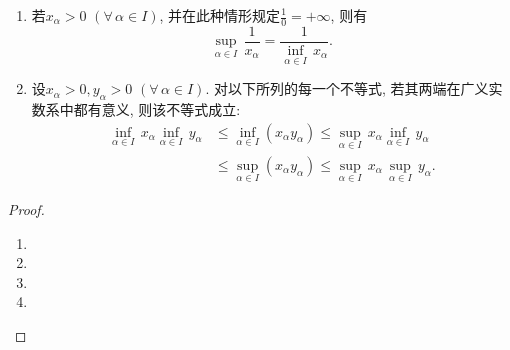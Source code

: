 \begin{4a}
\begin{itemize}
\begin{enumerate}[label=(\roman*)]
\[\begin{split}
\leqslant\underset{\alpha\in I}{\sup}\,x_\alpha+\underset{\alpha\in I}{\sup}\,y_\alpha.
\end{split}\]
\item 若\(x_\alpha>0\) \((\forall\,\alpha\in I)\), 并在此种情形规定\(\frac{1}{0}=+\infty\), 则有\[ \underset{\alpha\in I}{\sup}\,\frac{1}{x_\alpha}=\frac{1}{\underset{\alpha\in I}{\inf}\,x_\alpha}.\]
\item 设\(x_\alpha>0,y_\alpha>0\) \((\forall\,\alpha\in I)\). 
对以下所列的每一个不等式, 若其两端在广义实数系中都有意义, 则该不等式成立: 
\[\begin{split}
\underset{\alpha\in I}{\inf}\,x_\alpha\underset{\alpha\in I}{\inf}\,y_\alpha
&\leqslant \underset{\alpha\in I}{\inf}(x_\alpha y_\alpha)
\leqslant\underset{\alpha\in I}{\sup}\,x_\alpha\underset{\alpha\in I}{\inf}\,y_\alpha\\
&\leqslant\underset{\alpha\in I}{\sup}(x_\alpha y_\alpha)
\leqslant\underset{\alpha\in I}{\sup}\,x_\alpha\,\underset{\alpha\in I}{\sup}\,y_\alpha.
\end{split}\]
\end{enumerate}
\begin{proof}
\begin{enumerate}[label=(\roman*)]
    \item
    \item
    \item
    \item
\end{enumerate}
\end{proof}
\end{itemize}
\end{4a}

